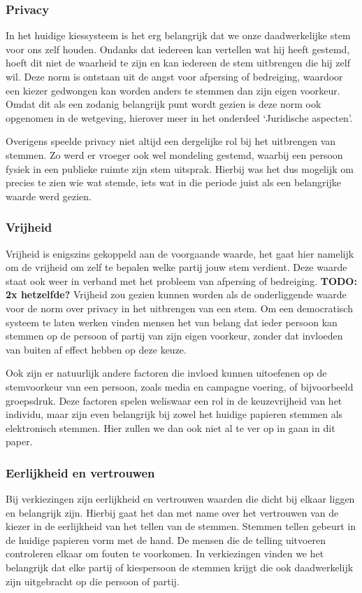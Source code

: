 \documentclass[a4paper]{article}
\newcommand{\TODO}[1]{{\color{red}\textbf{TODO: #1}}}
\begin{document}
\subsubsection{Privacy}
In het huidige kiessysteem is het erg belangrijk dat we onze daadwerkelijke stem voor ons zelf houden.
Ondanks dat iedereen kan vertellen wat hij heeft gestemd, hoeft dit niet de waarheid te zijn en kan iedereen de stem uitbrengen die hij zelf wil.
Deze norm is ontstaan uit de angst voor afpersing of bedreiging, waardoor een kiezer gedwongen kan worden anders te stemmen dan zijn eigen voorkeur.
Omdat dit als een zodanig belangrijk punt wordt gezien is deze norm ook opgenomen in de wetgeving, hierover meer in het onderdeel `Juridische aspecten'.

Overigens speelde privacy niet altijd een dergelijke rol bij het uitbrengen van stemmen.
Zo werd er vroeger ook wel mondeling gestemd, waarbij een persoon fysiek in een publieke ruimte zijn stem uitsprak.
Hierbij was het dus mogelijk om precies te zien wie wat stemde, iets wat in die periode juist als een belangrijke waarde werd gezien.

\subsubsection{Vrijheid}
Vrijheid is enigszins gekoppeld aan de voorgaande waarde, het gaat hier namelijk om de vrijheid om zelf te bepalen welke partij jouw stem verdient.
Deze waarde staat ook weer in verband met het probleem van afpersing of bedreiging.
\TODO{2x hetzelfde?}
Vrijheid zou gezien kunnen worden als de onderliggende waarde voor de norm over privacy in het uitbrengen van een stem.
Om een democratisch systeem te laten werken vinden mensen het van belang dat ieder persoon kan stemmen op de persoon of partij van zijn eigen voorkeur, zonder dat invloeden van buiten af effect hebben op deze keuze.

Ook zijn er natuurlijk andere factoren die invloed kunnen uitoefenen op de stemvoorkeur van een persoon, zoals media en campagne voering, of bijvoorbeeld groepsdruk.
Deze factoren spelen weliswaar een rol in de keuzevrijheid van het individu, maar zijn even belangrijk bij zowel het huidige papieren stemmen als elektronisch stemmen.
Hier zullen we dan ook niet al te ver op in gaan in dit paper.

\subsubsection{Eerlijkheid en vertrouwen}
Bij verkiezingen zijn eerlijkheid en vertrouwen waarden die dicht bij elkaar liggen en belangrijk zijn.
Hierbij gaat het dan met name over het vertrouwen van de kiezer in de eerlijkheid van het tellen van de stemmen.
Stemmen tellen gebeurt in de huidige papieren vorm met de hand.
De mensen die de telling uitvoeren controleren elkaar om fouten te voorkomen. 
In verkiezingen vinden we het belangrijk dat elke partij of kiespersoon de stemmen krijgt die ook daadwerkelijk zijn uitgebracht op die persoon of partij.
\end{document}
